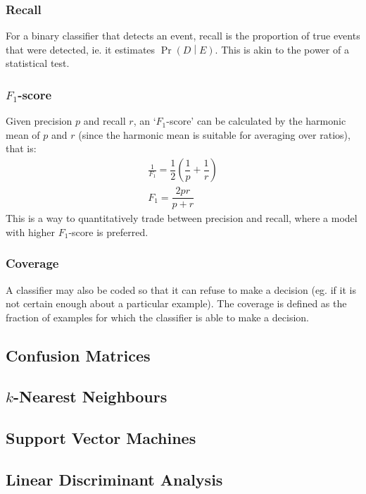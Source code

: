 \documentclass[11pt]{report} %
\begin{document}
\subsubsection{Recall}

For a binary classifier that detects an event, recall is the proportion of true events that were detected, ie. it estimates $\operatorname{Pr}\left(D\middle|E\right)$. This is akin to the power of a statistical test.

\subsubsection{$F_{1}$-score}

Given precision $p$ and recall $r$, an `$F_{1}$-score' can be calculated by the harmonic mean of $p$ and $r$ (since the harmonic mean is suitable for averaging over ratios), that is:
\begin{gather}
\frac{1}{F_{1}} = \dfrac{1}{2}\left(\dfrac{1}{p} + \dfrac{1}{r}\right) \\
F_{1} = \dfrac{2pr}{p + r}
\end{gather}
This is a way to quantitatively trade between precision and recall, where a model with higher $F_{1}$-score is preferred.

\subsubsection{Coverage}

A classifier may also be coded so that it can refuse to make a decision (eg. if it is not certain enough about a particular example). The coverage is defined as the fraction of examples for which the classifier is able to make a decision.

\subsection{Confusion Matrices}

\subsection{$k$-Nearest Neighbours}

\subsection{Support Vector Machines}

\subsection{Linear Discriminant Analysis}
\end{document}
